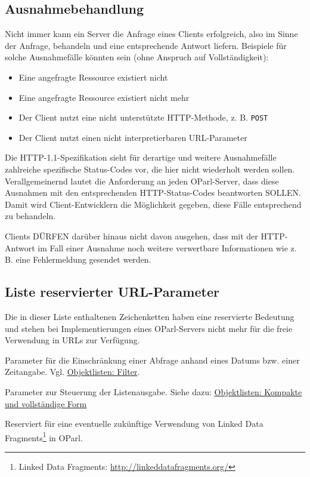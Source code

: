 \documentclass[,a4paper]{article}
\begin{document}
\subsection{Ausnahmebehandlung}\label{ausnahmebehandlung}

Nicht immer kann ein Server die Anfrage eines Clients erfolgreich, also
im Sinne der Anfrage, behandeln und eine entsprechende Antwort liefern.
Beispiele für solche Ausnahmefälle könnten sein (ohne Anspruch auf
Vollständigkeit):

\begin{itemize}
\item
  Eine angefragte Ressource existiert nicht
\item
  Eine angefragte Ressource existiert nicht mehr
\item
  Der Client nutzt eine nicht unterstützte HTTP-Methode, z. B.
  \texttt{POST}
\item
  Der Client nutzt einen nicht interpretierbaren URL-Parameter
\end{itemize}

Die HTTP-1.1-Spezifikation sieht für derartige und weitere Ausnahmefälle
zahlreiche spezifische Status-Codes vor, die hier nicht wiederholt
werden sollen. Verallgemeinernd lautet die Anforderung an jeden
OParl-Server, dass diese Ausnahmen mit den entsprechenden
HTTP-Status-Codes beantworten SOLLEN. Damit wird Client-Entwicklern die
Möglichkeit gegeben, diese Fälle entsprechend zu behandeln.

Clients DÜRFEN darüber hinaus nicht davon ausgehen, dass mit der
HTTP-Antwort im Fall einer Ausnahme noch weitere verwertbare
Informationen wie z. B. eine Fehlermeldung gesendet werden.

\subsection{Liste reservierter
URL-Parameter}\label{liste-reservierter-url-parameter}

Die in dieser Liste enthaltenen Zeichenketten haben eine reservierte
Bedeutung und stehen bei Implementierungen eines OParl-Servers nicht
mehr für die freie Verwendung in URLs zur Verfügung.

\begin{description}
\itemsep1pt\parskip0pt
\item[\texttt{startdate}, \texttt{enddate}:]
Parameter für die Einschränkung einer Abfrage anhand eines Datums bzw.
einer Zeitangabe. Vgl. \hyperref[filter]{Objektlisten: Filter}.
\item[\texttt{listformat}:]
Parameter zur Steuerung der Listenausgabe. Siehe dazu:
\hyperref[objektlistenux5flistformat]{Objektlisten: Kompakte und
vollständige Form}
\item[\texttt{subject}, \texttt{predicate}, \texttt{object}:]
Reserviert für eine eventuelle zukünftige Verwendung von Linked Data
Fragments\footnote{Linked Data Fragments:
  \url{http://linkeddatafragments.org/}} in OParl.
\end{description}
\end{document}
